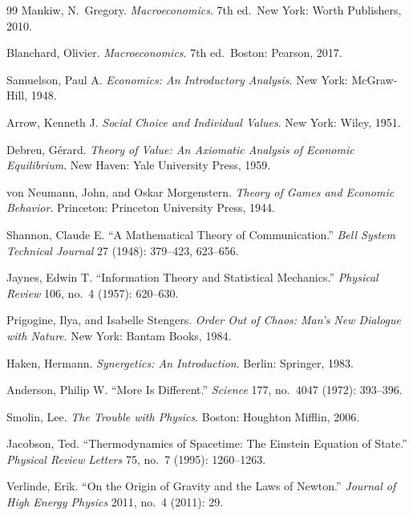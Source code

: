 \documentclass[12pt,a4paper]{article}
\begin{document}
\begin{thebibliography}{99}
Mankiw, N.\ Gregory.
\textit{Macroeconomics}.
7th ed.\ New York: Worth Publishers, 2010.

Blanchard, Olivier.
\textit{Macroeconomics}.
7th ed.\ Boston: Pearson, 2017.

Samuelson, Paul A.
\textit{Economics: An Introductory Analysis}.
New York: McGraw-Hill, 1948.

Arrow, Kenneth J.
\textit{Social Choice and Individual Values}.
New York: Wiley, 1951.

Debreu, G\'erard.
\textit{Theory of Value: An Axiomatic Analysis of Economic Equilibrium}.
New Haven: Yale University Press, 1959.

von Neumann, John, and Oskar Morgenstern.
\textit{Theory of Games and Economic Behavior}.
Princeton: Princeton University Press, 1944.

Shannon, Claude E.
``A Mathematical Theory of Communication.''
\textit{Bell System Technical Journal} 27 (1948): 379--423, 623--656.

Jaynes, Edwin T.
``Information Theory and Statistical Mechanics.''
\textit{Physical Review} 106, no.\ 4 (1957): 620--630.

Prigogine, Ilya, and Isabelle Stengers.
\textit{Order Out of Chaos: Man's New Dialogue with Nature}.
New York: Bantam Books, 1984.

Haken, Hermann.
\textit{Synergetics: An Introduction}.
Berlin: Springer, 1983.

Anderson, Philip W.
``More Is Different.''
\textit{Science} 177, no.\ 4047 (1972): 393--396.

Smolin, Lee.
\textit{The Trouble with Physics}.
Boston: Houghton Mifflin, 2006.

Jacobson, Ted.
``Thermodynamics of Spacetime: The Einstein Equation of State.''
\textit{Physical Review Letters} 75, no.\ 7 (1995): 1260--1263.

Verlinde, Erik.
``On the Origin of Gravity and the Laws of Newton.''
\textit{Journal of High Energy Physics} 2011, no.\ 4 (2011): 29.

\end{thebibliography}
\end{document}
